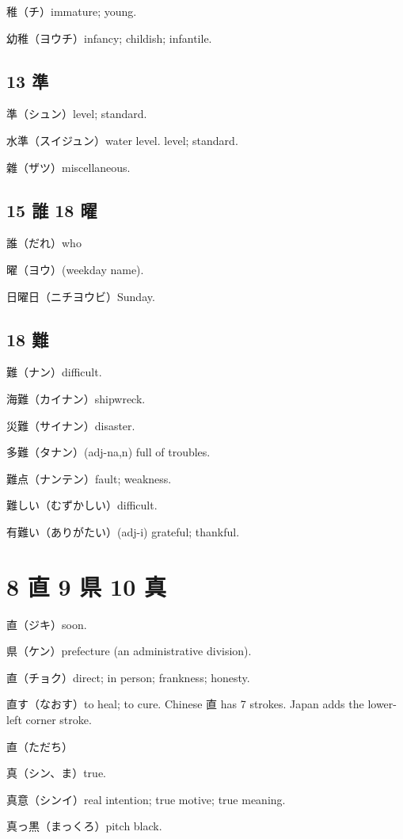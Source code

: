 稚（チ）immature; young.

幼稚（ヨウチ）infancy; childish; infantile.

\subsection{13 準}

準（シュン）level; standard.

水準（スイジュン）water level. level; standard.

雜（ザツ）miscellaneous.

\subsection{15 誰 18 曜}

誰（だれ）who

曜（ヨウ）(weekday name).

日曜日（ニチヨウビ）Sunday.

\subsection{18 難}

難（ナン）difficult.

海難（カイナン）shipwreck.

災難（サイナン）disaster.

多難（タナン）(adj-na,n) full of troubles.

難点（ナンテン）fault; weakness.

難しい（むずかしい）difficult.

有難い（ありがたい）(adj-i) grateful; thankful.

\section{8 直 9 県 10 真}

直（ジキ）soon.

県（ケン）prefecture (an administrative division).

直（チョク）direct; in person; frankness; honesty.

直す（なおす）to heal; to cure.
Chinese 直 has 7 strokes.
Japan adds the lower-left corner stroke.

直（ただち）

真（シン、ま）true.

真意（シンイ）real intention; true motive; true meaning.

真っ黒（まっくろ）pitch black.

